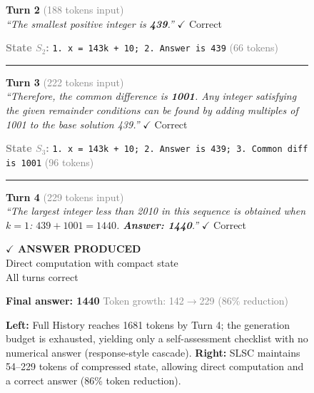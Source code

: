 \begin{figure}[!t]
\begin{minipage}[t]{0.48\textwidth}
\begin{mdframed}
    \textcolor{blue!70}{\textbf{Turn 2}} \textcolor{gray}{(188 tokens input)}\\
    \textit{``The smallest positive integer is \textbf{439}.''}
    \hfill{\scriptsize\textcolor{green!60!black}{$\checkmark$ Correct}}

    \textcolor{gray}{\textbf{State $S_2$:}} \texttt{1. x = 143k + 10; 2. Answer is 439} \textcolor{gray}{(66 tokens)}

    \vspace{2pt}\hrule\vspace{2pt}

    \textcolor{blue!70}{\textbf{Turn 3}} \textcolor{gray}{(222 tokens input)}\\
    \textit{``Therefore, the common difference is \textbf{1001}. Any integer satisfying the given remainder conditions can be found by adding multiples of 1001 to the base solution 439.''}
    \hfill{\scriptsize\textcolor{green!60!black}{$\checkmark$ Correct}}

    \textcolor{gray}{\textbf{State $S_3$:}} \texttt{1. x = 143k + 10; 2. Answer is 439; 3. Common diff is 1001} \textcolor{gray}{(96 tokens)}

    \vspace{2pt}\hrule\vspace{2pt}

    \textcolor{blue!70}{\textbf{Turn 4}} \textcolor{gray}{(229 tokens input)}\\
    \textit{``The largest integer less than 2010 in this sequence is obtained when $k=1$: $439 + 1001 = 1440$. \textbf{Answer: 1440}.''}
    \hfill{\scriptsize\textcolor{green!60!black}{$\checkmark$ Correct}}

    \vspace{3pt}
    \colorbox{green!25}{\parbox{0.92\linewidth}{\centering\textbf{$\checkmark$ ANSWER PRODUCED}\\Direct computation with compact state\\All turns correct}}

    \vspace{3pt}
    \textcolor{green!70!black}{\textbf{Final answer: 1440}} \hfill \textcolor{gray}{Token growth: 142$\rightarrow$229 (86\% reduction)}
    \end{mdframed}
  \end{minipage}

  \caption{\textbf{Left:} Full History reaches 1681 tokens by Turn 4; the generation budget is exhausted, yielding only a self-assessment checklist with no numerical answer (response-style cascade). \textbf{Right:} SLSC maintains 54--229 tokens of compressed state, allowing direct computation and a correct answer (86\% token reduction).}
  \label{fig:case_4b}
\end{figure}

